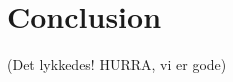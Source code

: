 \documentclass[Main]{subfiles}
\begin{document}
\section*{Conclusion}

(Det lykkedes! HURRA, vi er gode)
\end{document}
